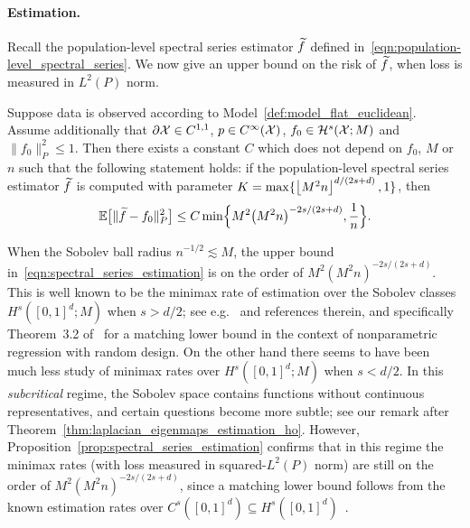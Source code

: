 \paragraph{Estimation.}
Recall the population-level spectral series estimator $\widetilde{f}$ defined in~\eqref{eqn:population-level_spectral_series}. We now give an upper bound on the risk of $\widetilde{f}$, when loss is measured in $L^2(P)$ norm.
\begin{proposition}
	\label{prop:spectral_series_estimation}
	Suppose data is observed according to Model~\ref{def:model_flat_euclidean}. Assume additionally that $\partial \mathcal{X} \in C^{1,1}$, $p \in C^{\infty}(\mathcal{X})$, $f_0 \in \mathcal{H}^{s}(\mathcal{X};M)$ and $\|f_0\|_P^2 \leq 1$. Then there exists a constant $C$ which does not depend on $f_0$, $M$ or $n$ such that the following statement holds: if the population-level spectral series estimator $\widetilde{f}$ is computed with parameter $K = \max\{\left\lfloor M^2n \right\rfloor^{d/(2s + d)},1\}$, then
	\begin{equation}
	\label{eqn:spectral_series_estimation}
	\mathbb{E}\bigl[\|\widetilde{f} - f_0\|_P^2\bigr] \leq C \min\Bigl\{M^2\bigl(M^2n\bigr)^{-2s/(2s + d)}, \frac{1}{n}\Bigr\}.
	\end{equation}
\end{proposition}
When the Sobolev ball radius $n^{-1/2} \lesssim M$, the upper bound in~\eqref{eqn:spectral_series_estimation} is on the order of $M^2(M^2n)^{-2s/(2s + d)}$. This is well known to be the minimax rate of estimation over the Sobolev classes $H^s([0,1]^d;M)$ when $s > d/2$; see e.g.~\cite{gyorfi2006,wasserman2006,tsybakov08} and references therein, and specifically Theorem~3.2 of~\cite{gyorfi2006} for a matching lower bound in the context of nonparametric regression with random design. On the other hand there seems to have been much less study of minimax rates over $H^s([0,1]^d;M)$ when $s < d/2$. In this \emph{subcritical} regime, the Sobolev space contains functions without continuous representatives, and certain questions become more subtle; see our remark after Theorem~\ref{thm:laplacian_eigenmaps_estimation_ho}. However, Proposition~\ref{prop:spectral_series_estimation} confirms that in this regime the minimax rates (with loss measured in squared-$L^2(P)$ norm) are still on the order of $M^2(M^2n)^{-2s/(2s + d)}$, since a matching lower bound follows from the known estimation rates over $C^s([0,1]^d) \subseteq H^s([0,1]^d)$~\citep{stone1980}.

